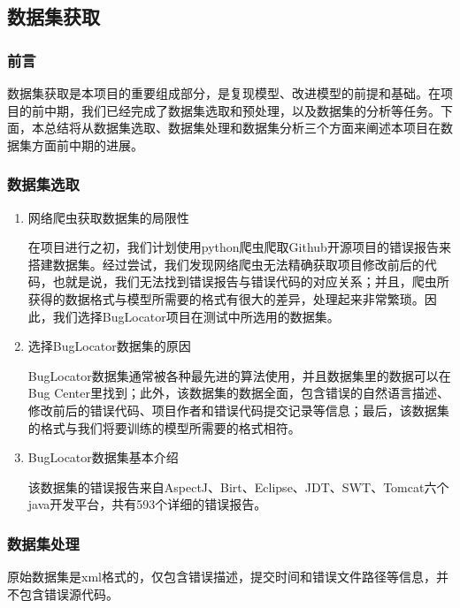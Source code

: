 \documentclass[
]{article}
\begin{document}
\subsection{数据集获取}\label{ux6570ux636eux96c6ux83b7ux53d6}

\subsubsection{前言}\label{ux524dux8a00}

数据集获取是本项目的重要组成部分，是复现模型、改进模型的前提和基础。在项目的前中期，我们已经完成了数据集选取和预处理，以及数据集的分析等任务。下面，本总结将从数据集选取、数据集处理和数据集分析三个方面来阐述本项目在数据集方面前中期的进展。

\subsubsection{数据集选取}\label{ux6570ux636eux96c6ux9009ux53d6}

\begin{enumerate}
  \def\labelenumi{\arabic{enumi}.}
  \item
        网络爬虫获取数据集的局限性

        在项目进行之初，我们计划使用python爬虫爬取Github开源项目的错误报告来搭建数据集。经过尝试，我们发现网络爬虫无法精确获取项目修改前后的代码，也就是说，我们无法找到错误报告与错误代码的对应关系；并且，爬虫所获得的数据格式与模型所需要的格式有很大的差异，处理起来非常繁琐。因此，我们选择BugLocator项目在测试中所选用的数据集。
  \item
        选择BugLocator数据集的原因

        BugLocator数据集通常被各种最先进的算法使用，并且数据集里的数据可以在Bug
        Center里找到；此外，该数据集的数据全面，包含错误的自然语言描述、修改前后的错误代码、项目作者和错误代码提交记录等信息；最后，该数据集的格式与我们将要训练的模型所需要的格式相符。
  \item
        BugLocator数据集基本介绍

        该数据集的错误报告来自AspectJ、Birt、Eclipse、JDT、SWT、Tomcat六个java开发平台，共有593个详细的错误报告。
\end{enumerate}

\subsubsection{数据集处理}\label{ux6570ux636eux96c6ux5904ux7406}

原始数据集是xml格式的，仅包含错误描述，提交时间和错误文件路径等信息，并不包含错误源代码。
\end{document}
